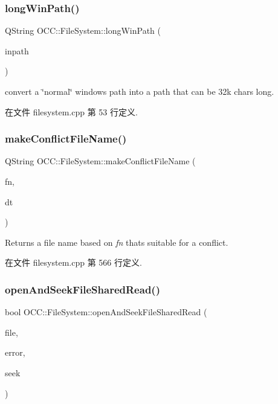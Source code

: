 \subsubsection{\texorpdfstring{long\+Win\+Path()}{longWinPath()}}
{\footnotesize\ttfamily Q\+String O\+C\+C\+::\+File\+System\+::long\+Win\+Path (\begin{DoxyParamCaption}\item[{const Q\+String \&}]{inpath }\end{DoxyParamCaption})}

convert a \char`\"{}normal\char`\"{} windows path into a path that can be 32k chars long. 

在文件 filesystem.\+cpp 第 53 行定义.

\mbox{\label{namespace_o_c_c_1_1_file_system_a256b42d497859d2117c151f6a88145fa}} 
\subsubsection{\texorpdfstring{make\+Conflict\+File\+Name()}{makeConflictFileName()}}
{\footnotesize\ttfamily Q\+String O\+C\+C\+::\+File\+System\+::make\+Conflict\+File\+Name (\begin{DoxyParamCaption}\item[{const Q\+String \&}]{fn,  }\item[{const Q\+Date\+Time \&}]{dt }\end{DoxyParamCaption})}

Returns a file name based on {\itshape fn} that\textquotesingle{}s suitable for a conflict. 

在文件 filesystem.\+cpp 第 566 行定义.

\mbox{\label{namespace_o_c_c_1_1_file_system_a74cbbe123be7666a93799a28d8eb7546}} 
\subsubsection{\texorpdfstring{open\+And\+Seek\+File\+Shared\+Read()}{openAndSeekFileSharedRead()}}
{\footnotesize\ttfamily bool O\+C\+C\+::\+File\+System\+::open\+And\+Seek\+File\+Shared\+Read (\begin{DoxyParamCaption}\item[{Q\+File $\ast$}]{file,  }\item[{Q\+String $\ast$}]{error,  }\item[{qint64}]{seek }\end{DoxyParamCaption})}

